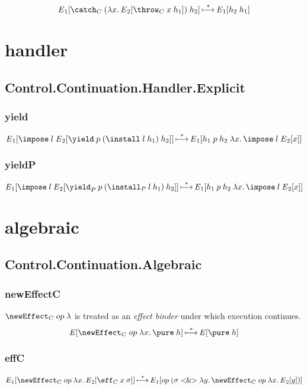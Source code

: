 \documentclass{report}
\begin{document}
\[
  {\E}_1 \sq{\catch_C \app \br{ \lam x {{\E}_2 \sq{\throw_C \app x \app h_1}} } \app h_2}
    \step^*
  {\E}_1 \sq{h_2 \app h_1}
\]


\chapter{handler} %

\section{Control.Continuation.Handler.Explicit}

\subsection{yield}

\[
  {\E}_1 \sq{\impose \app l \app {\E}_2 \sq{\yield \app p \app {\left( \install \app l \app h_1 \right)} \app h_2}}
    \step^*
  {\E}_1 \sq{h_1 \app p \app h_2 \app \lam x {\impose \app l \app {\E}_2 \sq x}}
\]

\subsection{yieldP}

\[
  {\E}_1 \sq{\impose \app l \app {\E}_2 \sq{\yield_P \app p \app {\left( \install_P \app l \app h_1 \right)} \app h_2}}
    \step^*
  {\E}_1 \sq{h_1 \app p \app h_2 \app \lam x {\impose \app l \app {\E}_2 \sq x}}
\]


\chapter{algebraic} %

\section{Control.Continuation.Algebraic}

\subsection{newEffectC}

\( \newEffect_C \app op \app \lambda \) is treated as an \emph{effect binder} under which execution continues. \[
  {\E} \sq{\newEffect_C \app op \app \lam x {\pure \app h}}
    \step^*
  {\E} \sq{\pure \app h}
\]

\subsection{effC}

\[
  {\E}_1 \sq{ \newEffect_C \app op \app \lam x {{\E}_2 \sq{\eff_C \app x \app \sigma}} }
    \step^*
  {\E}_1 \sq{op \app \br{ \sigma \mapping \lam y {\newEffect_C \app op \app \lam x {{\E}_2 \sq y}} }}
\]

\end{document}
